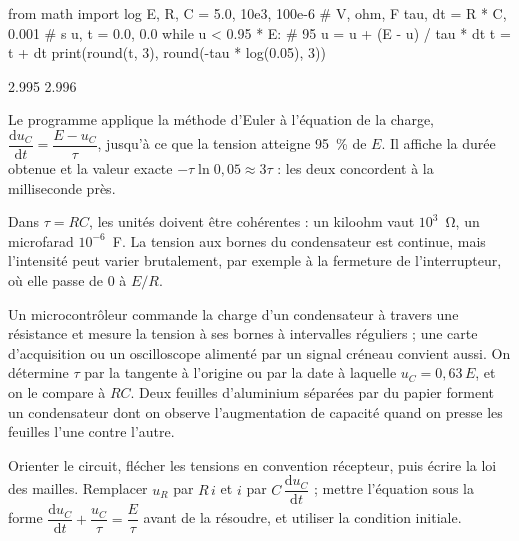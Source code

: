 \begin{codecote}[0.64]
\begin{pythoncol}
from math import log
E, R, C = 5.0, 10e3, 100e-6      # V, ohm, F
tau, dt = R * C, 0.001           # s
u, t = 0.0, 0.0
while u < 0.95 * E:              # 95 %
    u = u + (E - u) / tau * dt
    t = t + dt
print(round(t, 3), round(-tau * log(0.05), 3))
\end{pythoncol}
\begin{consolecol}
2.995 2.996
\end{consolecol}
\cote
\fontsize{9.5}{12.5}\selectfont
{}\par\smallskip
Le programme applique la méthode d'Euler à l'équation de la charge, $\dfrac{\mathrm{d}u_C}{\mathrm{d}t}=\dfrac{E-u_C}{\tau}$, jusqu'à ce que
la tension atteigne 95~\% de $E$. Il affiche la durée obtenue et la valeur exacte $-\tau\ln0{,}05\approx3\tau$ : les deux
concordent à la milliseconde près.
\end{codecote}
\begin{attention}
Dans $\tau=RC$, les unités doivent être cohérentes : un kiloohm vaut $10^3$~\unit{\ohm}, un microfarad $10^{-6}$~F. La tension aux
bornes du condensateur est continue, mais l'intensité peut varier brutalement, par exemple à la fermeture de
l'interrupteur, où elle passe de 0 à $E/R$.
\end{attention}
\begin{experience}
Un microcontrôleur commande la charge d'un condensateur à travers une résistance et mesure la tension à ses bornes à
intervalles réguliers ; une carte d'acquisition ou un oscilloscope alimenté par un signal créneau convient aussi. On
détermine $\tau$ par la tangente à l'origine ou par la date à laquelle $u_C=0{,}63\,E$, et on le compare à $RC$. Deux
feuilles d'aluminium séparées par du papier forment un condensateur dont on observe l'augmentation de capacité quand
on presse les feuilles l'une contre l'autre.
\end{experience}
\begin{rediger}
Orienter le circuit, flécher les tensions en convention récepteur, puis écrire la loi des mailles. Remplacer $u_R$ par $R\,i$
et $i$ par $C\,\dfrac{\mathrm{d}u_C}{\mathrm{d}t}$ ; mettre l'équation sous la forme $\dfrac{\mathrm{d}u_C}{\mathrm{d}t}+\dfrac{u_C}{\tau}=\dfrac{E}{\tau}$ avant de
la résoudre, et utiliser la condition initiale.
\end{rediger}
\exercices

